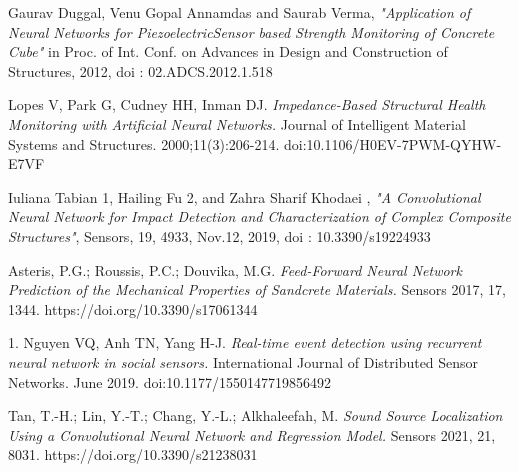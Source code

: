 \documentclass[12pt]{article}
\begin{document}
\begin{thebibliography}{9}
Gaurav Duggal, Venu Gopal Annamdas and Saurab Verma, \emph{"Application of Neural Networks for PiezoelectricSensor
based Strength Monitoring of Concrete Cube"} in Proc. of Int. Conf. on Advances in Design and Construction of Structures,
2012, doi : 02.ADCS.2012.1.518

Lopes V, Park G, Cudney HH, Inman DJ. \emph{Impedance-Based Structural Health Monitoring with Artificial Neural Networks.} Journal of Intelligent Material Systems and Structures. 2000;11(3):206-214. doi:10.1106/H0EV-7PWM-QYHW-E7VF

Iuliana Tabian 1, Hailing Fu 2, and Zahra Sharif Khodaei , \emph{"A Convolutional Neural Network for Impact Detection and
Characterization of Complex Composite Structures"}, Sensors, 19, 4933, Nov.12, 2019, doi : 10.3390/s19224933

Asteris, P.G.; Roussis, P.C.; Douvika, M.G. \emph{Feed-Forward Neural Network Prediction of the Mechanical Properties of Sandcrete Materials.} Sensors 2017, 17, 1344. https://doi.org/10.3390/s17061344

1. Nguyen VQ, Anh TN, Yang H-J. \emph{Real-time event detection using recurrent neural network in social sensors.} International Journal of Distributed Sensor Networks. June 2019. doi:10.1177/1550147719856492

Tan, T.-H.; Lin, Y.-T.; Chang, Y.-L.; Alkhaleefah, M. \emph{Sound Source Localization Using a Convolutional Neural Network and Regression Model.} Sensors 2021, 21, 8031. https://doi.org/10.3390/s21238031
 
\end{thebibliography}
 
\end{document}
